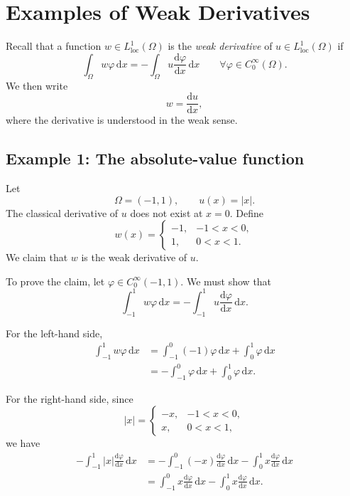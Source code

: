 \documentclass[11pt]{article}
\newcommand{\Om}{\Omega}
\newcommand{\dd}{\mathrm{d}}
\begin{document}
\section*{Examples of Weak Derivatives}

Recall that a function $w\in L^1_{\mathrm{loc}}(\Om)$ is the
\emph{weak derivative} of $u\in L^1_{\mathrm{loc}}(\Om)$ if
\begin{equation}
    \int_{\Om} w\varphi\,\dd x
    =
    -\int_{\Om}u\frac{\dd\varphi}{\dd x}\,\dd x
    \qquad
    \forall \varphi\in C_0^\infty(\Om).
    \label{eq:weak-derivative}
\end{equation}
We then write
\[
w=\frac{\dd u}{\dd x},
\]
where the derivative is understood in the weak sense.

\subsection*{Example 1: The absolute-value function}

Let
\[
\Om=(-1,1),
\qquad
u(x)=|x|.
\]
The classical derivative of $u$ does not exist at $x=0$. Define
\[
w(x)=
\begin{cases}
-1, & -1<x<0,\\[2mm]
 1, & 0<x<1.
\end{cases}
\]
We claim that $w$ is the weak derivative of $u$.

To prove the claim, let $\varphi\in C_0^\infty(-1,1)$. We must show that
\[
\int_{-1}^{1}w\varphi\,\dd x
=
-\int_{-1}^{1}u\frac{\dd\varphi}{\dd x}\,\dd x.
\]

For the left-hand side,
\begin{align}
\int_{-1}^{1}w\varphi\,\dd x
&=
\int_{-1}^{0}(-1)\varphi\,\dd x
+
\int_{0}^{1}\varphi\,\dd x
\nonumber\\
&=
-\int_{-1}^{0}\varphi\,\dd x
+
\int_{0}^{1}\varphi\,\dd x.
\label{eq:absolute-lhs}
\end{align}

For the right-hand side, since
\[
|x|=
\begin{cases}
-x, & -1<x<0,\\
 x, & 0<x<1,
\end{cases}
\]
we have
\begin{align}
-\int_{-1}^{1}|x|\frac{\dd\varphi}{\dd x}\,\dd x
&=
-\int_{-1}^{0}(-x)\frac{\dd\varphi}{\dd x}\,\dd x
-\int_{0}^{1}x\frac{\dd\varphi}{\dd x}\,\dd x
\nonumber\\
&=
\int_{-1}^{0}x\frac{\dd\varphi}{\dd x}\,\dd x
-\int_{0}^{1}x\frac{\dd\varphi}{\dd x}\,\dd x.
\label{eq:absolute-rhs-1}
\end{align}
\end{document}
